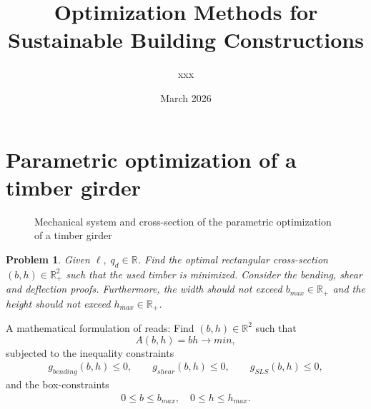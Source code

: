 \documentclass[a4paper]{article}
\title{Optimization Methods for Sustainable Building Constructions}
\author{xxx}
\date{March 2026}
\newtheorem{problem}{Problem}
\newcommand{\R}{\mathbb{R}}
\begin{document}
\maketitle
\begin{abstract}

\end{abstract}


\tableofcontents
\clearpage
\section{Parametric optimization of a timber girder}
\begin{figure}[htb]
    \centering
    \caption{Mechanical system and cross-section of the parametric optimization of a timber girder}
    \label{fig:timber}
\end{figure}
	 \begin{problem}\label{prob:timeber}
	     Given $\ell,\; q_d\in\R$. Find the optimal rectangular cross-section $(b,h)\in \mathbb R^2_+$ such that the used timber is minimized. Consider the bending, shear and deflection proofs.
    Furthermore, the width should not exceed $b_{max}\in\R_+$ and the height should not exceed $h_{max}\in\R_+$.
\end{problem}
A mathematical formulation of  reads: Find $(b,h)\in \mathbb R^2$ such that
	\begin{equation*}
		A(b,h) = b h  \rightarrow min,
	\end{equation*}
	subjected to the inequality constraints
	\begin{align*}
		g_{bending}(b,h) \le 0, \qquad g_{shear}(b,h) \le 0, \qquad
		g_{SLS}(b,h) \le 0,
	\end{align*}
	and the box-constraints
	\begin{align*}
	0\le b \le b_{max},\quad 0\le h \le h_{max}.
	\end{align*}
\end{document}
